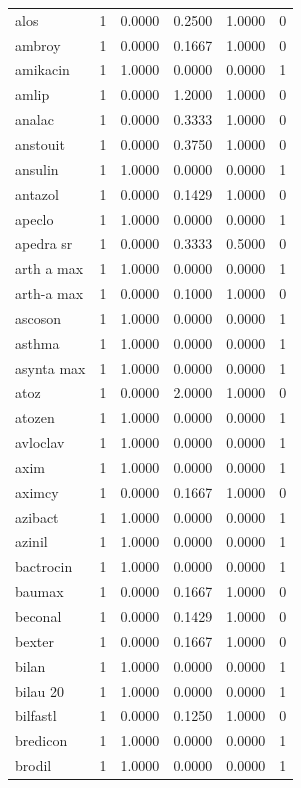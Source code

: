 \begin{longtable}{p{3.0cm}rrrrr}
alos & 1 & 0.0000 & 0.2500 & 1.0000 & 0 \\
ambroy & 1 & 0.0000 & 0.1667 & 1.0000 & 0 \\
amikacin & 1 & 1.0000 & 0.0000 & 0.0000 & 1 \\
amlip & 1 & 0.0000 & 1.2000 & 1.0000 & 0 \\
analac & 1 & 0.0000 & 0.3333 & 1.0000 & 0 \\
anstouit & 1 & 0.0000 & 0.3750 & 1.0000 & 0 \\
ansulin & 1 & 1.0000 & 0.0000 & 0.0000 & 1 \\
antazol & 1 & 0.0000 & 0.1429 & 1.0000 & 0 \\
apeclo & 1 & 1.0000 & 0.0000 & 0.0000 & 1 \\
apedra sr & 1 & 0.0000 & 0.3333 & 0.5000 & 0 \\
arth a max & 1 & 1.0000 & 0.0000 & 0.0000 & 1 \\
arth-a max & 1 & 0.0000 & 0.1000 & 1.0000 & 0 \\
ascoson & 1 & 1.0000 & 0.0000 & 0.0000 & 1 \\
asthma & 1 & 1.0000 & 0.0000 & 0.0000 & 1 \\
asynta max & 1 & 1.0000 & 0.0000 & 0.0000 & 1 \\
atoz & 1 & 0.0000 & 2.0000 & 1.0000 & 0 \\
atozen & 1 & 1.0000 & 0.0000 & 0.0000 & 1 \\
avloclav & 1 & 1.0000 & 0.0000 & 0.0000 & 1 \\
axim & 1 & 1.0000 & 0.0000 & 0.0000 & 1 \\
aximcy & 1 & 0.0000 & 0.1667 & 1.0000 & 0 \\
azibact & 1 & 1.0000 & 0.0000 & 0.0000 & 1 \\
azinil & 1 & 1.0000 & 0.0000 & 0.0000 & 1 \\
bactrocin & 1 & 1.0000 & 0.0000 & 0.0000 & 1 \\
baumax & 1 & 0.0000 & 0.1667 & 1.0000 & 0 \\
beconal & 1 & 0.0000 & 0.1429 & 1.0000 & 0 \\
bexter & 1 & 0.0000 & 0.1667 & 1.0000 & 0 \\
bilan & 1 & 1.0000 & 0.0000 & 0.0000 & 1 \\
bilau 20 & 1 & 1.0000 & 0.0000 & 0.0000 & 1 \\
bilfastl & 1 & 0.0000 & 0.1250 & 1.0000 & 0 \\
bredicon & 1 & 1.0000 & 0.0000 & 0.0000 & 1 \\
brodil & 1 & 1.0000 & 0.0000 & 0.0000 & 1 \\

\end{longtable}
